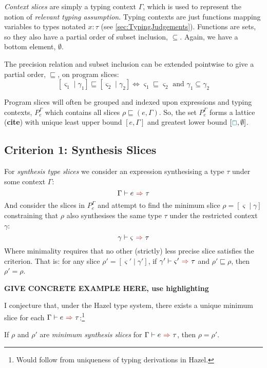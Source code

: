 \textit{Context slices} are simply a typing context $\Gamma$, which is used to represent the notion of \textit{relevant typing assumption}. Typing contexts are just functions mapping variables to types notated $x : \tau$ (see \cref{sec:TypingJudgements}). Functions are sets, so they also have a partial order of subset inclusion, $\subseteq$. Again, we have a bottom element, $\emptyset$.

The precision relation and subset inclusion can be extended pointwise to give a partial order, $\sqsubseteq$, on program slices:
\[[\varsigma_1\mid \gamma_1] \sqsubseteq [\varsigma_2\mid \gamma_2] \iff  \varsigma_1 \sqsubseteq \varsigma_2 \text{ and } \gamma_1 \subseteq \gamma_2\]

Program slices will often be grouped and indexed upon expressions and typing contexts, $P_e^{\Gamma}$ which contains all slices $\rho \sqsubseteq (e, \Gamma)$. So, the set $P_e^{\Gamma}$ forms a lattice (\textbf{cite}) with unique least upper bound $[e, \Gamma]$ and greatest lower bound $[{\color{teal}\Box}, \emptyset]$.

\subsection{Criterion 1: Synthesis Slices}
\label{sec:SynthesisSlices}
For \textit{synthesis type slices} we consider an expression synthesising a type $\tau$ under some context $\Gamma$:
\[\synthesis{e}{\tau}\]
And consider the slices in $P_e^{\Gamma}$ and attempt to find the minimum slice $\rho = [\varsigma\mid \gamma]$ constraining that $\rho$ also synthesises the same type $\tau$ under the restricted context $\gamma$:
\[\synthesis[\gamma]{\varsigma}{\tau}\]
Where minimality requires that no other (strictly) less precise slice satisfies the criterion. That is: for any slice $\rho' = [\varsigma'\mid \gamma']$, if $\synthesis[\gamma']{\varsigma'}{\tau}$ and $\rho' \sqsubseteq \rho$, then $\rho' = \rho$.

\textbf{GIVE CONCRETE EXAMPLE HERE, use highlighting}

I conjecture that, under the Hazel type system, there exists a unique minimum slice for each $\synthesis{e}{\tau}$:\footnote{Would follow from uniqueness of typing derivations in Hazel.}
\begin{conjecture}[Uniqueness]\label{conj:SynthesisSliceUniqueness}
If $\rho$ and $\rho'$ are \textit{minimum synthesis slices} for $\synthesis{e}{\tau}$, then $\rho = \rho'$.
\end{conjecture}

